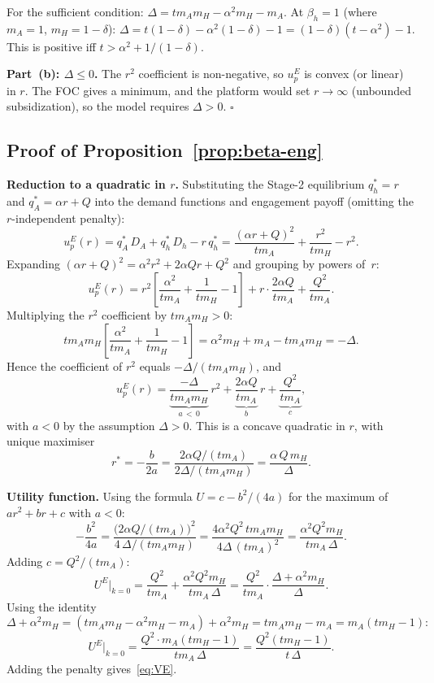\documentclass[mnsc,nonblindrev]{informs3_NoOR}
\begin{document}
For the sufficient condition: $\Delta = tm_Am_H - \alpha^2 m_H - m_A$. At $\beta_h = 1$ (where $m_A = 1$, $m_H = 1-\delta$): $\Delta = t(1-\delta) - \alpha^2(1-\delta) - 1 = (1-\delta)(t-\alpha^2) - 1$. This is positive iff $t > \alpha^2 + 1/(1-\delta)$.
 
\medskip\noindent\textbf{Part~(b): $\Delta \leq 0$.}
The $r^2$ coefficient is non-negative, so $u_p^E$ is convex (or linear) in $r$. The FOC gives a minimum, and the platform would set $r \to \infty$ (unbounded subsidization), so the model requires $\Delta > 0$. \hfill$\square$
 
\subsection*{Proof of Proposition~\ref{prop:beta-eng}}
 
\noindent\textbf{Reduction to a quadratic in $r$.}
Substituting the Stage-2 equilibrium $q_h^* = r$ and $q_A^* = \alpha r + Q$ into the demand functions and engagement payoff (omitting the $r$-independent penalty):
\[
u_p^E(r) = q_A^*\,D_A + q_h^*\,D_h - r\,q_h^* = \frac{(\alpha r + Q)^2}{tm_A} + \frac{r^2}{tm_H} - r^2.
\]
Expanding $(\alpha r + Q)^2 = \alpha^2 r^2 + 2\alpha Qr + Q^2$ and grouping by powers of~$r$:
\[
u_p^E(r) = r^2\!\left[\frac{\alpha^2}{tm_A} + \frac{1}{tm_H} - 1\right] + r\cdot\frac{2\alpha Q}{tm_A} + \frac{Q^2}{tm_A}.
\]
Multiplying the $r^2$ coefficient by $tm_Am_H > 0$:
\[
tm_Am_H\!\left[\frac{\alpha^2}{tm_A} + \frac{1}{tm_H} - 1\right] = \alpha^2 m_H + m_A - tm_Am_H = -\Delta.
\]
Hence the coefficient of $r^2$ equals $-\Delta/(tm_Am_H)$, and
\[
u_p^E(r) = \underbrace{\frac{-\Delta}{tm_Am_H}}_{a\,<\,0}\,r^2 + \underbrace{\frac{2\alpha Q}{tm_A}}_{b}\,r + \underbrace{\frac{Q^2}{tm_A}}_{c},
\]
with $a < 0$ by the assumption $\Delta > 0$. This is a concave quadratic in $r$, with unique maximiser
\[
r^* = -\frac{b}{2a} = \frac{2\alpha Q/(tm_A)}{2\Delta/(tm_Am_H)} = \frac{\alpha\,Q\,m_H}{\Delta}.
\]
 
\medskip\noindent\textbf{Utility function.}
Using the formula $U = c - b^2/(4a)$ for the maximum of $ar^2 + br + c$ with $a < 0$:
\[
-\frac{b^2}{4a} = \frac{\bigl(2\alpha Q/(tm_A)\bigr)^2}{4\,\Delta/(tm_Am_H)} = \frac{4\alpha^2 Q^2\,tm_Am_H}{4\Delta\,(tm_A)^2} = \frac{\alpha^2 Q^2 m_H}{tm_A\,\Delta}.
\]
Adding $c = Q^2/(tm_A)$:
\[
U^E\big|_{k=0} = \frac{Q^2}{tm_A} + \frac{\alpha^2 Q^2 m_H}{tm_A\,\Delta} = \frac{Q^2}{tm_A}\cdot\frac{\Delta + \alpha^2 m_H}{\Delta}.
\]
Using the identity
\[
\Delta + \alpha^2 m_H = (tm_Am_H - \alpha^2 m_H - m_A) + \alpha^2 m_H = tm_Am_H - m_A = m_A(tm_H - 1):
\]
\[
U^E\big|_{k=0} = \frac{Q^2\cdot m_A(tm_H-1)}{tm_A\,\Delta} = \frac{Q^2(tm_H-1)}{t\,\Delta}.
\]
Adding the penalty gives~\eqref{eq:VE}.
 
\end{document}
